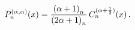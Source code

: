 \[\mathop{P^{(\alpha,\alpha)}_{n}\/}\nolimits\!\left(x\right)=\frac{\left(\alpha%
+1\right)_{n}}{\left(2\alpha+1\right)_{n}}\mathop{C^{(\alpha+\frac{1}{2})}_{n}%
\/}\nolimits\!\left(x\right).\]